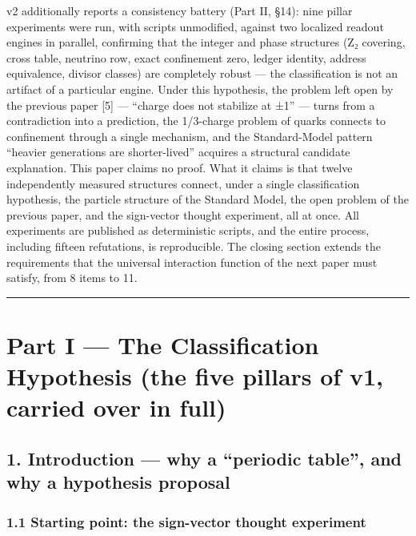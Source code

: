 \documentclass[
]{article}
\begin{document}
v2 additionally reports a consistency battery (Part II, §14): nine
pillar experiments were run, with scripts unmodified, against two
localized readout engines in parallel, confirming that the integer and
phase structures (Z₂ covering, cross table, neutrino row, exact
confinement zero, ledger identity, address equivalence, divisor classes)
are completely robust --- the classification is not an artifact of a
particular engine. Under this hypothesis, the problem left open by the
previous paper {[}5{]} --- ``charge does not stabilize at ±1'' --- turns
from a contradiction into a prediction, the 1/3-charge problem of quarks
connects to confinement through a single mechanism, and the
Standard-Model pattern ``heavier generations are shorter-lived''
acquires a structural candidate explanation. This paper claims no proof.
What it claims is that twelve independently measured structures connect,
under a single classification hypothesis, the particle structure of the
Standard Model, the open problem of the previous paper, and the
sign-vector thought experiment, all at once. All experiments are
published as deterministic scripts, and the entire process, including
fifteen refutations, is reproducible. The closing section extends the
requirements that the universal interaction function of the next paper
must satisfy, from 8 items to 11.

\begin{center}\rule{0.5\linewidth}{0.5pt}\end{center}

\section{Part I --- The Classification Hypothesis (the five pillars of
v1, carried over in
full)}\label{part-i-the-classification-hypothesis-the-five-pillars-of-v1-carried-over-in-full}

\subsection{1. Introduction --- why a ``periodic table'', and why a
hypothesis
proposal}\label{introduction-why-a-periodic-table-and-why-a-hypothesis-proposal}

\subsubsection{1.1 Starting point: the sign-vector thought
experiment}\label{starting-point-the-sign-vector-thought-experiment}
\end{document}
